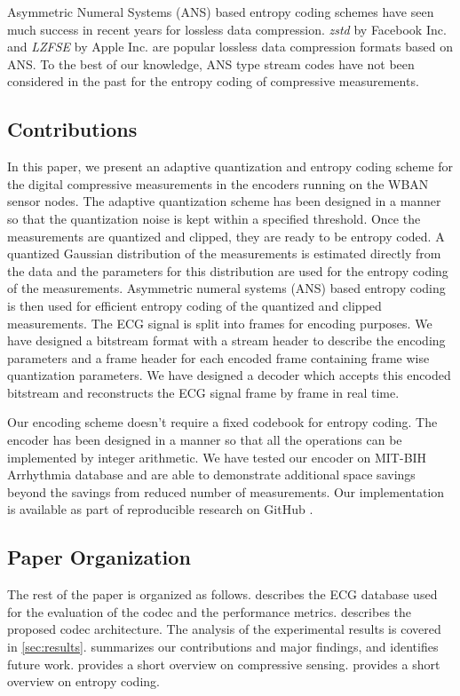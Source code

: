  Asymmetric Numeral Systems (ANS) \cite{duda2013asymmetric}
 based entropy coding schemes have seen much success
 in recent years for lossless data compression.
 \emph{zstd} by Facebook Inc. \cite{zstd}
 and \emph{LZFSE} by Apple Inc. are popular lossless
 data compression formats based on ANS.
 To the best of our knowledge, ANS type stream codes
 have not been considered in the past for the entropy
 coding of compressive measurements.


\subsection{Contributions}
In this paper, we present an adaptive quantization and
entropy coding scheme for the digital compressive measurements
in the encoders running on the WBAN sensor nodes.
The adaptive quantization scheme has been designed in a manner
so that the quantization noise is kept within a specified
threshold. Once the measurements are quantized and clipped,
they are ready to be entropy coded. A quantized Gaussian
distribution of the measurements is estimated directly from
the data and the parameters for this distribution are used
for the entropy coding of the measurements.  
Asymmetric numeral systems (ANS) based
entropy coding is then used for efficient entropy coding
of the quantized and clipped measurements.
The ECG signal is split into frames for encoding purposes.
We have designed a bitstream format with a stream header
to describe the encoding parameters and a frame header
for each encoded frame containing frame wise quantization
parameters. We have designed a decoder which accepts this
encoded bitstream and reconstructs the ECG signal frame by
frame in real time. 

Our encoding scheme doesn't require a fixed codebook
for entropy coding. The encoder has been
designed in a manner so that all the operations can
be implemented by integer arithmetic. We have
tested our encoder on MIT-BIH Arrhythmia database
and are able to demonstrate additional space savings
beyond the savings from reduced number of measurements.
Our implementation is available as part of
reproducible research on GitHub \cite{kumar2022ecgcodec}.

\subsection{Paper Organization}
The rest of the paper is organized as follows.
 describes the ECG database
used for the evaluation of the codec and the
performance metrics.
 describes the proposed codec architecture.
The analysis of the experimental results is covered in \cref{sec:results}.
 summarizes our contributions and major findings, and
identifies future work.
 provides a short overview on
compressive sensing.
 provides a short overview on
entropy coding.

